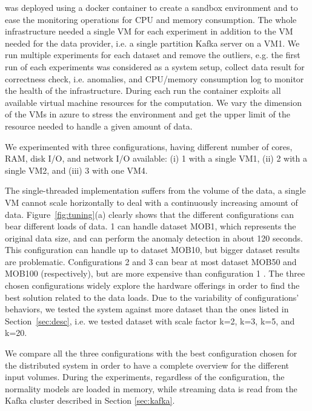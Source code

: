 {%
\sti{} was deployed using a docker container to create a sandbox environment and to ease the monitoring operations for CPU and memory consumption. The whole infrastructure needed a single VM for each experiment in addition to the VM needed for the data provider,  i.e. a single partition Kafka server on a VM1.
We run multiple experiments for each dataset and remove the outliers, e.g. the first run of each experiments was considered as a system setup, collect data result for correctness check, i.e. anomalies, and CPU/memory consumption log to monitor the health of the infrastructure. During each run the container exploits all available virtual machine resources for the computation. We vary the dimension of the VMs in azure to stress the environment and get the upper limit of the resource needed to handle a given amount of data.

We experimented with three configurations, having different number of cores, RAM, disk I/O, and network I/O available: (i) \sti{}1 with a single VM1, (ii) \sti{}2 with a single VM2, and (iii) \sti{}3 with one VM4.

The single-threaded implementation suffers from the volume of the data, a single VM cannot scale horizontally to deal with a continuously increasing amount of data. 
Figure~\ref{fig:tuning}(a) clearly shows that the different configurations can bear different loads of data.
\sti{}1 can handle dataset MOB1, which represents the original data size, and can perform the anomaly detection in about 120 seconds. This configuration can handle up to dataset MOB10, but bigger dataset results are problematic. Configurations \sti{}2 and \sti{}3 can bear at most dataset MOB50 and MOB100  (respectively), but are more expensive than configuration \sti{}1 .
The three chosen configurations widely explore the hardware offerings in order to find the best solution related to the data loads. Due to the variability of configurations' behaviors, we tested the system against more dataset than the ones listed in Section~\ref{sec:desc}, i.e. we tested dataset with scale factor k=2, k=3, k=5, and k=20.

We compare all the three \sti{} configurations with the best configuration chosen for the distributed system in order to have a complete overview for the different input volumes. During the experiments, regardless of the \sti{} configuration, the normality models are loaded in memory, while streaming data is read from the Kafka cluster described in Section \ref{sec:kafka}.

}
